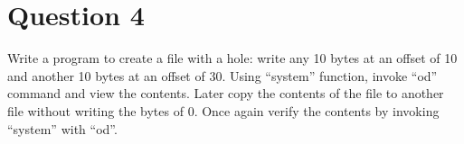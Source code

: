 \documentclass[main.tex]{subfiles}
\begin{document}
\section{Question 4}
Write a program to create a file with a hole: write any 10 bytes at an offset of
10 and another 10 bytes at an offset of 30. Using “system” function, invoke “od”
command and view the contents. Later copy the contents of the file to another
file without writing the bytes of 0. Once again verify the contents by invoking
“system” with “od”.



\end{document}
